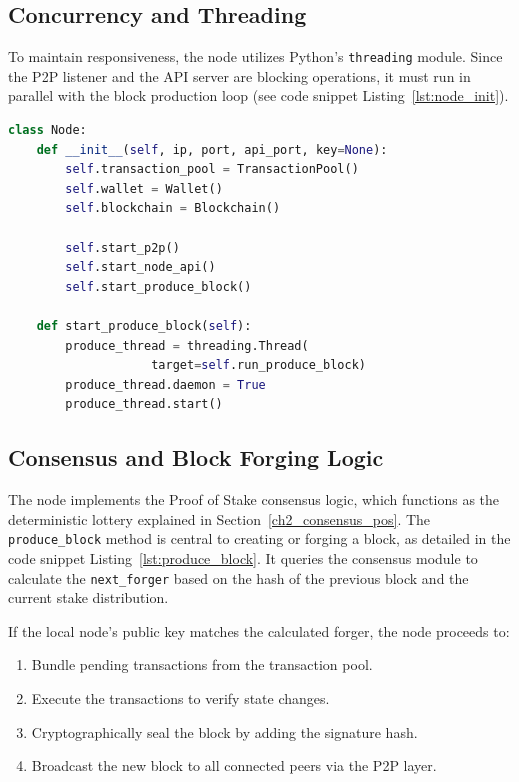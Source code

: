 \subsection{Concurrency and Threading}
To maintain responsiveness, the node utilizes Python's \texttt{threading} module. Since the P2P listener and the API server are blocking operations, it must run in parallel with the block production loop (see code snippet Listing~\ref{lst:node_init}).

\begin{lstlisting}[language=Python, caption=Node Initialization and Threading code snippet, label=lst:node_init]
class Node:
    def __init__(self, ip, port, api_port, key=None):
        self.transaction_pool = TransactionPool()
        self.wallet = Wallet()
        self.blockchain = Blockchain()
        
        self.start_p2p()
        self.start_node_api()
        self.start_produce_block()

    def start_produce_block(self):
        produce_thread = threading.Thread(
                    target=self.run_produce_block)
        produce_thread.daemon = True
        produce_thread.start()


\end{lstlisting}

\subsection{Consensus and Block Forging Logic}
The node implements the Proof of Stake consensus logic, which functions as the deterministic lottery explained in Section~\ref{ch2_consensus_pos}. The \texttt{produce\_block} method is central to creating or forging a block, as detailed in the code snippet Listing~\ref{lst:produce_block}. It queries the consensus module to calculate the \texttt{next\_forger} based on the hash of the previous block and the current stake distribution.

If the local node's public key matches the calculated forger, the node proceeds to:
\begin{enumerate}
    \item Bundle pending transactions from the transaction pool.
    \item Execute the transactions to verify state changes.
    \item Cryptographically seal the block by adding the signature hash.
    \item Broadcast the new block to all connected peers via the P2P layer.
\end{enumerate}

